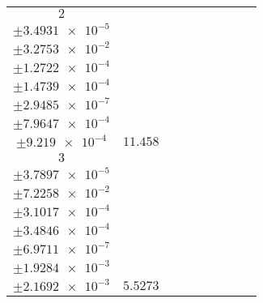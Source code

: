 \documentclass[8pt]{article}
\begin{document}
\begin{longtable}[l]{c c c c c c c c c}
$\num{2}$ & \begin{tabular}[c]{@{}c@{}}$\num{6.1335e-2}$ \\ $\pm\num{3.4931e-5}$\end{tabular} & \begin{tabular}[c]{@{}c@{}}$\num{-0.571}$ \\ $\pm\num{3.2753e-2}$\end{tabular} & \begin{tabular}[c]{@{}c@{}}$\num{-5.2053}$ \\ $\pm\num{1.2722e-4}$\end{tabular} & \begin{tabular}[c]{@{}c@{}}$\num{632.48}$ \\ $\pm\num{1.4739e-4}$\end{tabular} & \begin{tabular}[c]{@{}c@{}}$\num{1.2653}$ \\ $\pm\num{2.9485e-7}$\end{tabular} & \begin{tabular}[c]{@{}c@{}}$\num{1.2033}$ \\ $\pm\num{7.9647e-4}$\end{tabular} & \begin{tabular}[c]{@{}c@{}}$\num{1.2002}$ \\ $\pm\num{9.219e-4}$\end{tabular} & $\num{11.458}$\\
$\num{3}$ & \begin{tabular}[c]{@{}c@{}}$\num{3.0384e-2}$ \\ $\pm\num{3.7897e-5}$\end{tabular} & \begin{tabular}[c]{@{}c@{}}$\num{6.2694e-2}$ \\ $\pm\num{7.2258e-2}$\end{tabular} & \begin{tabular}[c]{@{}c@{}}$\num{-1.909}$ \\ $\pm\num{3.1017e-4}$\end{tabular} & \begin{tabular}[c]{@{}c@{}}$\num{635.77}$ \\ $\pm\num{3.4846e-4}$\end{tabular} & \begin{tabular}[c]{@{}c@{}}$\num{1.2719}$ \\ $\pm\num{6.9711e-7}$\end{tabular} & \begin{tabular}[c]{@{}c@{}}$\num{1.3344}$ \\ $\pm\num{1.9284e-3}$\end{tabular} & \begin{tabular}[c]{@{}c@{}}$\num{1.3325}$ \\ $\pm\num{2.1692e-3}$\end{tabular} & $\num{5.5273}$\\

\end{longtable}
\end{document}

